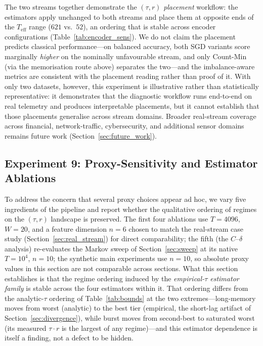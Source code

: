 \documentclass[sensors,article,submit,pdftex,moreauthors]{Definitions/mdpi}
\newcommand{\Teff}{T_{\mathrm{eff}}}
\begin{document}
The two streams together demonstrate the $(\tau, r)$ \emph{placement} workflow: the estimators apply unchanged to both streams and place them at opposite ends of the $\Teff$ range ($621$ vs.\ $52$), an ordering that is stable across encoder configurations (Table~\ref{tab:encoder_sens}). We do not claim the placement predicts classical performance---on balanced accuracy, both SGD variants score marginally \emph{higher} on the nominally unfavourable stream, and only Count-Min (via the memorisation route above) separates the two---and the imbalance-aware metrics are consistent with the placement reading rather than proof of it. With only two datasets, however, this experiment is illustrative rather than statistically representative: it demonstrates that the diagnostic workflow runs end-to-end on real telemetry and produces interpretable placements, but it cannot establish that those placements generalise across stream domains. Broader real-stream coverage across financial, network-traffic, cybersecurity, and additional sensor domains remains future work (Section~\ref{sec:future_work}).


\subsection{Experiment 9: Proxy-Sensitivity and Estimator Ablations}
\label{sec:ablations}

To address the concern that several proxy choices appear ad hoc, we vary five ingredients of the pipeline and report whether the qualitative ordering of regimes on the $(\tau, r)$ landscape is preserved. The first four ablations use $T = 4096$, $W = 20$, and a feature dimension $n = 6$ chosen to match the real-stream case study (Section~\ref{sec:real_stream}) for direct comparability; the fifth (the $C$--$\delta$ analysis) re-evaluates the Markov sweep of Section~\ref{sec:sweep} at its native $T = 10^{4}$, $n = 10$; the synthetic main experiments use $n = 10$, so absolute proxy values in this section are not comparable across sections. What this section establishes is that the regime ordering induced by the \emph{empirical-$\tau$ estimator family} is stable across the four estimators within it. That ordering differs from the analytic-$\tau$ ordering of Table~\ref{tab:bounds} at the two extremes---long-memory moves from worst (analytic) to the best tier (empirical, the short-lag artifact of Section~\ref{sec:divergence}), while burst moves from second-best to saturated worst (its measured $\tau \cdot r$ is the largest of any regime)---and this estimator dependence is itself a finding, not a defect to be hidden.
\end{document}
